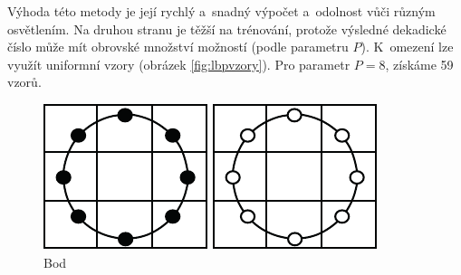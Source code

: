 Výhoda této metody je její rychlý a~snadný výpočet a~odolnost vůči různým osvětlením. Na druhou stranu je těžší na trénování, protože výsledné dekadické číslo může mít obrovské množství možností (podle parametru $P$). K~omezení lze využít uniformní vzory (obrázek \ref{fig:lbpvzory}). Pro parametr $P=8$, získáme 59 vzorů. 

\begin{figure}[H]
\centering
\begin{minipage}[b]{.18\textwidth}
  \centering
  \includegraphics[width=.9\linewidth]{assets/9_lbp_spot}
  \caption*{Bod}
\end{minipage}
\begin{minipage}[b]{.18\textwidth}
  \centering
  \includegraphics[width=.9\linewidth]{assets/9_lbp_spot_flat}

\end{minipage}
\end{figure}
